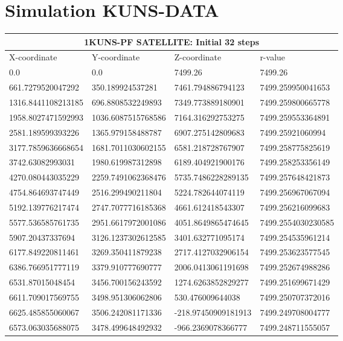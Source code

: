 \section{Simulation KUNS-DATA}
\begin{tabular}{ |p{4cm}|p{4cm}|p{4cm}|p{4cm}|  }
	\hline
	\multicolumn{4}{|c|}{1KUNS-PF SATELLITE: Initial 32 steps} \\
	\hline
	X-coordinate& Y-coordinate & Z-coordinate & r-value \\
	\hline
	0.0 & 0.0 & 7499.26 & 7499.26 \\
	661.7279520047292 & 350.189924537281 & 7461.794886794123 & 7499.259950041653\\
	1316.8441108213185 & 696.8808532249893 & 7349.773889180901 & 7499.259800665778\\
	1958.8027471592993 & 1036.6087515768586 & 7164.316292753275 & 7499.259553364891\\
	2581.189599393226 & 1365.979158488787 & 6907.275142809683 & 7499.25921060994\\
	3177.7859636668654 & 1681.7011030602155 & 6581.218728767907 & 7499.258775825619\\
	3742.63082993031 & 1980.619987312898 & 6189.404921900176 & 7499.258253356149\\
	4270.080443035229 & 2259.7491062368476 & 5735.7486228289135 & 7499.257648421873\\
	4754.864693747449 & 2516.299490211804 & 5224.782644074119 & 7499.256967067094\\
	5192.139776217474 & 2747.7077716185368 & 4661.612418543307 & 7499.256216099683\\
	5577.536585761735 & 2951.6617972001086 & 4051.8649865474645 & 7499.2554030230585\\
	5907.20437337694 & 3126.1237302612585 & 3401.632771095174 & 7499.254535961214\\
	6177.849220811461 & 3269.350411879238 & 2717.4127032906154 & 7499.253623577545\\
	6386.766951777119 & 3379.910777690777 & 2006.0413061191698 & 7499.252674988286\\
	6531.87015048454 & 3456.700156243592 & 1274.6263852829277 & 7499.251699671429\\
	6611.709017569755 & 3498.951306062806 & 530.476009644038 & 7499.250707372016\\
	6625.485855060067 & 3506.242081171336 & -218.97450909181913 & 7499.249708004777\\
	6573.063035688075 & 3478.499648492932 & -966.2369078366777 & 7499.248711555057\\

\end{tabular}

